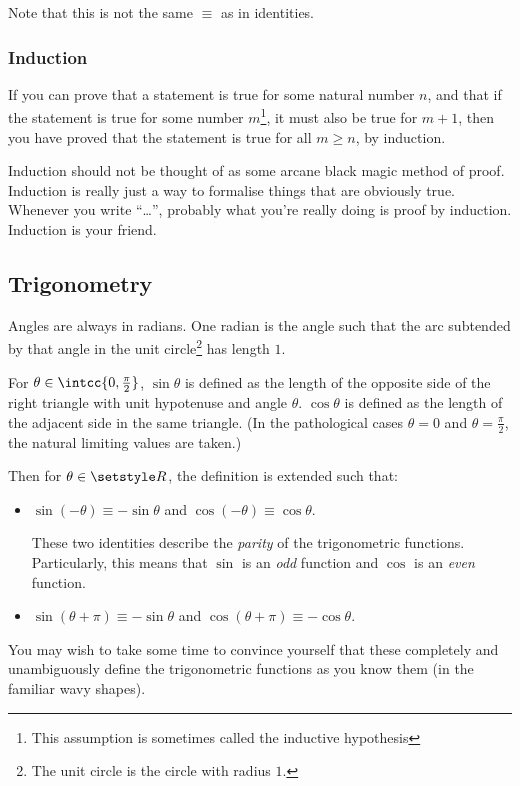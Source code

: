 Note that this is not the same \(\equiv\) as in identities.

\subsubsection{Induction}

If you can prove that a statement is true for some natural number \(n\), and
that if the statement is true for some number \(m\)\footnote{
 This assumption is sometimes called the inductive hypothesis
}, it must also be true for
\(m + 1\), then you have proved that the statement is true for all \(m \ge n\),
by induction.

Induction should not be thought of as some arcane black magic method of proof.
Induction is really just a way to formalise things that are obviously true.
Whenever you write ``\ldots'', probably what you're really doing is proof by
induction. Induction is your friend.

\subsection{Trigonometry}

Angles are always in radians. One radian is the angle such that the arc
subtended by that angle in the unit circle\footnote{
 The unit circle is the circle with radius \(1\).
} has length \(1\).

For \(\theta \in \intcc{0, \frac \pi 2}\), \(\sin \theta\) is defined as the
length of the opposite side of the right triangle with unit hypotenuse and angle
\(\theta\). \(\cos \theta\) is defined as the length of the adjacent side in the
same triangle. (In the pathological cases \(\theta = 0\) and
\(\theta = \frac \pi 2\), the natural limiting values are taken.)

Then for \(\theta \in \Reals\), the definition is extended such that:
\begin{itemize}
 \item
  \(\sin(-\theta) \equiv -\sin \theta\) and
  \(\cos(-\theta) \equiv \cos \theta\).

  These two identities describe the \emph{parity} of the trigonometric
  functions. Particularly, this means that \(\sin\) is an \emph{odd} function
  and \(\cos\) is an \emph{even} function.
 \item
  \(\sin(\theta + \pi) \equiv -\sin \theta\) and
  \(\cos(\theta + \pi) \equiv -\cos \theta\).
\end{itemize}
You may wish to take some time to convince yourself that these completely and
unambiguously define the trigonometric functions as you know them (in the
familiar wavy shapes).

